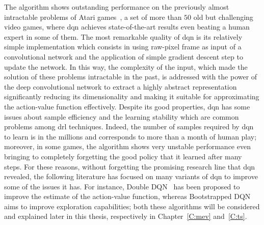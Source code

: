 The algorithm shows outstanding performance on the previously almost intractable problems of Atari games~\cite{bellemare2013arcade}, a set of more than $50$ old but challenging video games, where \gls{dqn} achieves state-of-the-art results even beating a human expert in some of them. The most remarkable quality of \gls{dqn} is its relatively simple implementation which consists in using raw-pixel frame as input of a convolutional network and the application of simple gradient descent step to update the network. In this way, the complexity of the input, which made the solution of these problems intractable in the past, is addressed with the power of the deep convolutional network to extract a highly abstract representation significantly reducing its dimensionality and making it suitable for approximating the action-value function effectively. Despite its good properties, \gls{dqn} has some issues about sample efficiency and the learning stability which are common problems among \gls{drl} techniques. Indeed, the number of samples required by \gls{dqn} to learn is in the millions and corresponds to more than a month of human play; moreover, in some games, the algorithm shows very unstable performance even bringing to completely forgetting the good policy that it learned after many steps. For these reasons, without forgetting the promising research line that \gls{dqn} revealed, the following literature has focused on many variants of \gls{dqn} to improve some of the issues it has. For instance, Double DQN~\cite{hasselt2015double} has been proposed to improve the estimate of the action-value function, whereas Bootstrapped DQN~\cite{osband2017deep} aims to improve exploration capabilities; both these algorithms will be considered and explained later in this thesis, respectively in Chapter~\ref{C:mev} and~\ref{C:ts}.
